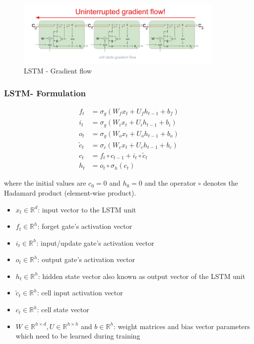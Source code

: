 \documentclass[12pt]{report}
\begin{document}
\begin{figure}[H]\centering\includegraphics[width=10cm]{LSTM_GRADIENT_FLOW.png}\caption{LSTM - Gradient flow}\end{figure}


\subsubsection{LSTM- Formulation}
\begin{align*}
	f_t &= \sigma_g(W_{f} x_t + U_{f} h_{t-1} + b_f) \\
	i_t &= \sigma_g(W_{i} x_t + U_{i} h_{t-1} + b_i) \\
	o_t &= \sigma_g(W_{o} x_t + U_{o} h_{t-1} + b_o) \\
	\tilde{c}_t &= \sigma_c(W_{c} x_t + U_{c} h_{t-1} + b_c) \\
	c_t &= f_t \circ c_{t-1} + i_t \circ \tilde{c}_t \\
	h_t &= o_t \circ \sigma_h(c_t)
\end{align*}

where the initial values are $c_0 = 0$ and $h_0 = 0$ and the operator $\circ$ denotes the Hadamard product (element-wise product). 

\begin{itemize}
	\item $x_t \in \mathbb{R}^{d}$: input vector to the LSTM unit 
	\item $f_t \in \mathbb{R}^{h}$: forget gate's activation vector
	\item $i_t \in \mathbb{R}^{h}$: input/update gate's activation vector 
	\item $o_t \in \mathbb{R}^{h}$: output gate's activation vector
	\item $h_t \in \mathbb{R}^{h}$: hidden state vector also known as output vector of the LSTM unit 
	\item $\tilde{c}_t \in \mathbb{R}^{h}$: cell input activation vector
	\item $c_t \in \mathbb{R}^{h}$: cell state vector
	\item $W \in \mathbb{R}^{h \times d}, U \in \mathbb{R}^{h \times h} $ and $b \in \mathbb{R}^{h}$: weight matrices and bias vector parameters which need to be learned during training
\end{itemize}
\end{document}
